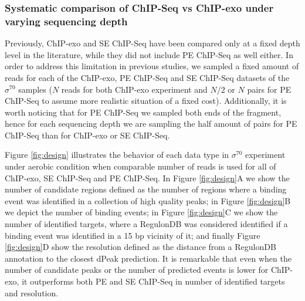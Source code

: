 \documentclass{bmcart}\usepackage[]{graphicx}\usepackage[]{color}
\newcommand{\sig}{\sigma^{70}}
\begin{document}

\subsubsection*{Systematic comparison of ChIP-Seq vs ChIP-exo under
  varying sequencing depth}

Previously, ChIP-exo and SE ChIP-Seq have been compared only at a
fixed depth level in the literature, while they did not include PE
ChIP-Seq as well either. In order to address this limitation in
previous studies, we sampled a fixed amount of reads for each of the
ChIP-exo, PE ChIP-Seq and SE ChIP-Seq datasets of the $\sig$ samples
($N$ reads for both ChIP-exo experiment and $N/2$ or $N$ pairs for PE
ChIP-Seq to assume more realistic situation of a fixed
cost). Additionally, it is worth noticing that for PE ChIP-Seq we
sampled both ends of the fragment, hence for each sequencing depth we
are sampling the half amount of pairs for PE ChIP-Seq than for
ChIP-exo or SE ChIP-Seq.


Figure \ref{fig:design} illustrates the behavior of each data type in
$\sig$ experiment under aerobic condition when comparable number of
reads is used for all of ChIP-exo, SE ChIP-Seq and PE ChIP-Seq. In
Figure \ref{fig:design}A we show the number of candidate regions
defined as the number of regions where a binding event was identified
in a collection of high quality peaks; in Figure \ref{fig:design}B we
depict the number of binding events; in Figure \ref{fig:design}C we
show the number of identified targets, where a RegulonDB was
considered identified if a binding event was identified in a 15 bp
vicinity of it; and finally Figure \ref{fig:design}D show the
resolution defined as the distance from a RegulonDB annotation to the
closest dPeak prediction. It is remarkable that even when the number
of candidate peaks or the number of predicted events is lower for
ChIP-exo, it outperforms both PE and SE ChIP-Seq in number of
identified targets and resolution.
\end{document}
